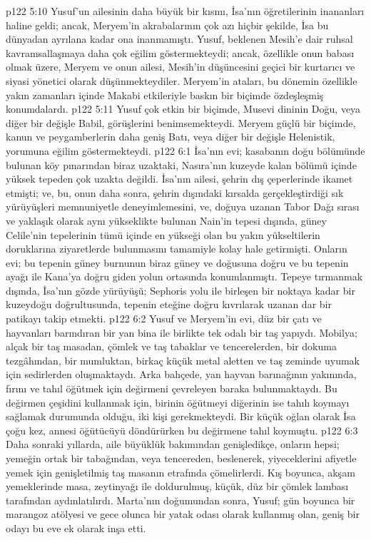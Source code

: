 \vs p122 5:10 Yusuf’un ailesinin daha büyük bir kısmı, İsa’nın öğretilerinin inananları haline geldi; ancak, Meryem’in akrabalarının çok azı hiçbir şekilde, İsa bu dünyadan ayrılana kadar ona inanmamıştı. Yusuf, beklenen Mesih’e dair ruhsal kavramsallaşmaya daha çok eğilim göstermekteydi; ancak, özellikle onun babası olmak üzere, Meryem ve onun ailesi, Mesih’in düşüncesini geçici bir kurtarıcı ve siyasi yönetici olarak düşünmekteydiler. Meryem’in ataları, bu dönemin özellikle yakın zamanları içinde Makabi etkileriyle baskın bir biçimde özdeşleşmiş konumdalardı.
\vs p122 5:11 Yusuf çok etkin bir biçimde, Musevi dininin Doğu, veya diğer bir değişle Babil, görüşlerini benimsemekteydi. Meryem güçlü bir biçimde, kanun ve peygamberlerin daha geniş Batı, veya diğer bir değişle Helenistik, yorumuna eğilim göstermekteydi.
\vs p122 6:1 İsa’nın evi; kasabanın doğu bölümünde bulunan köy pınarından biraz uzaktaki, Nasıra’nın kuzeyde kalan bölümü içinde yüksek tepeden çok uzakta değildi. İsa’nın ailesi, şehrin dış çeperlerinde ikamet etmişti; ve, bu, onun daha sonra, şehrin dışındaki kırsalda gerçekleştirdiği sık yürüyüşleri memnuniyetle deneyimlemesini, ve, doğuya uzanan Tabor Dağı sırası ve yaklaşık olarak aynı yükseklikte bulunan Nain’in tepesi dışında, güney Celile’nin tepelerinin tümü içinde en yükseği olan bu yakın yükseltilerin doruklarına ziyaretlerde bulunmasını tamamiyle kolay hale getirmişti. Onların evi; bu tepenin güney burnunun biraz güney ve doğusuna doğru ve bu tepenin ayağı ile Kana’ya doğru giden yolun ortasında konumlanmıştı. Tepeye tırmanmak dışında, İsa’nın gözde yürüyüşü; Sephoris yolu ile birleşen bir noktaya kadar bir kuzeydoğu doğrultusunda, tepenin eteğine doğru kıvrılarak uzanan dar bir patikayı takip etmekti.
\vs p122 6:2 Yusuf ve Meryem’in evi, düz bir çatı ve hayvanları barındıran bir yan bina ile birlikte tek odalı bir taş yapıydı. Mobilya; alçak bir taş masadan, çömlek ve taş tabaklar ve tencerelerden, bir dokuma tezgâhından, bir mumluktan, birkaç küçük metal aletten ve taş zeminde uyumak için sedirlerden oluşmaktaydı. Arka bahçede, yan hayvan barınağının yakınında, fırını ve tahıl öğütmek için değirmeni çevreleyen baraka bulunmaktaydı. Bu değirmen çeşidini kullanmak için, birinin öğütmeyi diğerinin ise tahılı koymayı sağlamak durumunda olduğu, iki kişi gerekmekteydi. Bir küçük oğlan olarak İsa çoğu kez, annesi öğütücüyü döndürürken bu değirmene tahıl koymuştu.
\vs p122 6:3 Daha sonraki yıllarda, aile büyüklük bakımından genişledikçe, onların hepsi; yemeğin ortak bir tabağından, veya tencereden, beslenerek, yiyeceklerini afiyetle yemek için genişletilmiş taş masanın etrafında çömelirlerdi. Kış boyunca, akşam yemeklerinde masa, zeytinyağı ile doldurulmuş, küçük, düz bir çömlek lambası tarafından aydınlatılırdı. Marta’nın doğumundan sonra, Yusuf; gün boyunca bir marangoz atölyesi ve gece olunca bir yatak odası olarak kullanmış olan, geniş bir odayı bu eve ek olarak inşa etti.
